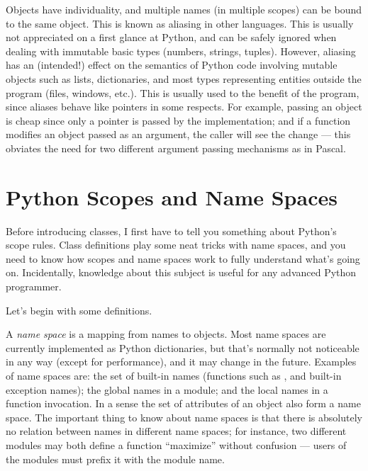 \documentclass{manual}
\begin{document}
Objects have individuality, and multiple names (in multiple scopes)
can be bound to the same object.  This is known as aliasing in other
languages.  This is usually not appreciated on a first glance at
Python, and can be safely ignored when dealing with immutable basic
types (numbers, strings, tuples).  However, aliasing has an
(intended!) effect on the semantics of Python code involving mutable
objects such as lists, dictionaries, and most types representing
entities outside the program (files, windows, etc.).  This is usually
used to the benefit of the program, since aliases behave like pointers
in some respects.  For example, passing an object is cheap since only
a pointer is passed by the implementation; and if a function modifies
an object passed as an argument, the caller will see the change --- this
obviates the need for two different argument passing mechanisms as in
Pascal.


\section{Python Scopes and Name Spaces \label{scopes}}

Before introducing classes, I first have to tell you something about
Python's scope rules.  Class definitions play some neat tricks with
name spaces, and you need to know how scopes and name spaces work to
fully understand what's going on.  Incidentally, knowledge about this
subject is useful for any advanced Python programmer.

Let's begin with some definitions.

A \emph{name space} is a mapping from names to objects.  Most name
spaces are currently implemented as Python dictionaries, but that's
normally not noticeable in any way (except for performance), and it
may change in the future.  Examples of name spaces are: the set of
built-in names (functions such as , and built-in exception
names); the global names in a module; and the local names in a
function invocation.  In a sense the set of attributes of an object
also form a name space.  The important thing to know about name
spaces is that there is absolutely no relation between names in
different name spaces; for instance, two different modules may both
define a function ``maximize'' without confusion --- users of the
modules must prefix it with the module name.
\end{document}
